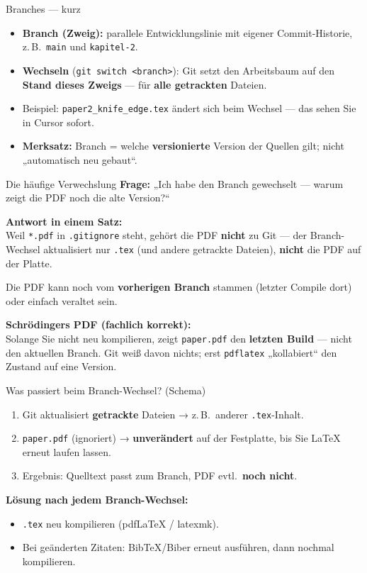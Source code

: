 \documentclass{beamer}
\begin{document}
\begin{frame}{Branches — kurz}
\begin{itemize}
\item \textbf{Branch (Zweig):} parallele Entwicklungslinie mit eigener Commit-Historie, z.\,B.\ \texttt{main} und \texttt{kapitel-2}.
\item \textbf{Wechseln} (\texttt{git switch <branch>}): Git setzt den Arbeitsbaum auf den \textbf{Stand dieses Zweigs} — für \textbf{alle getrackten} Dateien.
\item Beispiel: \texttt{paper2\_knife\_edge.tex} ändert sich beim Wechsel — das sehen Sie in Cursor sofort.
\item \textbf{Merksatz:} Branch = welche \textbf{versionierte} Version der Quellen gilt; nicht „automatisch neu gebaut“.
\end{itemize}
\end{frame}

\begin{frame}{Die häufige Verwechslung}
\textbf{Frage:} „Ich habe den Branch gewechselt — warum zeigt die PDF noch die alte Version?“

\vspace{0.5em}
\textbf{Antwort in einem Satz:}\\
Weil \texttt{*.pdf} in \texttt{.gitignore} steht, gehört die PDF \textbf{nicht} zu Git — der Branch-Wechsel aktualisiert nur \texttt{.tex} (und andere getrackte Dateien), \textbf{nicht} die PDF auf der Platte.

\vspace{0.5em}
Die PDF kann noch vom \textbf{vorherigen Branch} stammen (letzter Compile dort) oder einfach veraltet sein.

\vspace{0.4em}
\small\textbf{Schrödingers PDF (fachlich korrekt):}\\
Solange Sie nicht neu kompilieren, zeigt \texttt{paper.pdf} den \textbf{letzten Build} — nicht den aktuellen Branch. Git weiß davon nichts; erst \texttt{pdflatex} „kollabiert“ den Zustand auf eine Version.
\end{frame}

\begin{frame}{Was passiert beim Branch-Wechsel? (Schema)}
\begin{enumerate}
\item Git aktualisiert \textbf{getrackte} Dateien → z.\,B.\ anderer \texttt{.tex}-Inhalt.
\item \texttt{paper.pdf} (ignoriert) → \textbf{unverändert} auf der Festplatte, bis Sie LaTeX erneut laufen lassen.
\item Ergebnis: Quelltext passt zum Branch, PDF evtl.\ \textbf{noch nicht}.
\end{enumerate}
\vspace{0.3em}
\textbf{Lösung nach jedem Branch-Wechsel:}
\begin{itemize}
\item \texttt{.tex} neu kompilieren (pdfLaTeX / latexmk).
\item Bei geänderten Zitaten: BibTeX/Biber erneut ausführen, dann nochmal kompilieren.
\end{itemize}
\end{frame}
\end{document}
